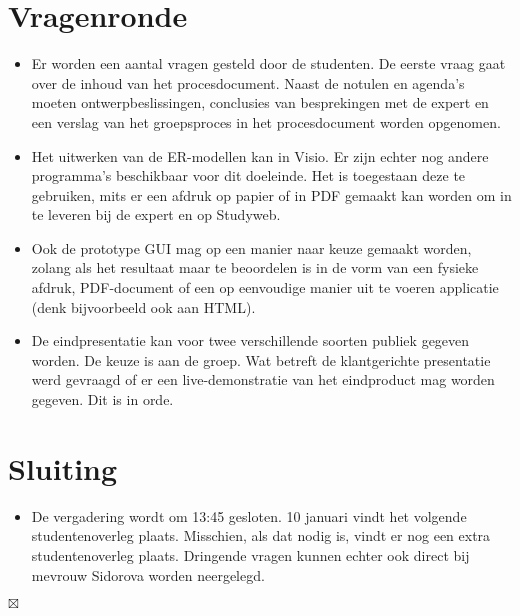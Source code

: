 \documentclass[]{article}
\begin{document}
\section{Vragenronde}

  \begin{itemize}
    \item Er worden een aantal vragen gesteld door de studenten. De eerste vraag gaat over de inhoud van het procesdocument. Naast de notulen en agenda's moeten ontwerpbeslissingen, conclusies van besprekingen met de expert en een verslag van het groepsproces in het procesdocument worden opgenomen.
        
    \item Het uitwerken van de ER-modellen kan in Visio. Er zijn echter nog andere programma's beschikbaar voor dit doeleinde. Het is toegestaan deze te gebruiken, mits er een afdruk op papier of in PDF gemaakt kan worden om in te leveren bij de expert en op Studyweb.
    
    \item Ook de prototype GUI mag op een manier naar keuze gemaakt worden, zolang als het resultaat maar te beoordelen is in de vorm van een fysieke afdruk, PDF-document of een op eenvoudige manier uit te voeren applicatie (denk bijvoorbeeld ook aan HTML).
        
    \item De eindpresentatie kan voor twee verschillende soorten publiek gegeven worden. De keuze is aan de groep. Wat betreft de klantgerichte presentatie werd gevraagd of er een live-demonstratie van het eindproduct mag worden gegeven. Dit is in orde.
  \end{itemize}
  
\section{Sluiting}

  \begin{itemize}
    \item De vergadering wordt om 13:45 gesloten. 10 januari vindt het volgende studentenoverleg plaats. Misschien, als dat nodig is, vindt er nog een extra studentenoverleg plaats. Dringende vragen kunnen echter ook direct bij mevrouw Sidorova worden neergelegd.
  \end{itemize}

$\boxtimes$
\end{document}
